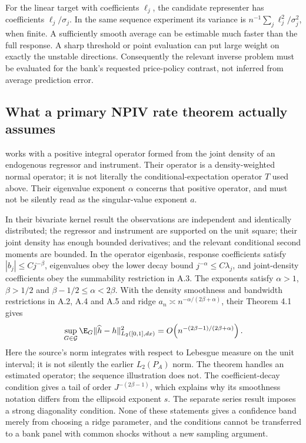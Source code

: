 For the linear target with coefficients $\ell_j$, the candidate
representer has coefficients $\ell_j/\sigma_j$. In the same sequence
experiment its variance is
$n^{-1}\sum_j\ell_j^2/\sigma_j^2$, when finite. A sufficiently
smooth average can be estimable much faster than the full response.
A sharp threshold or point evaluation can put large weight on exactly
the unstable directions. Consequently the relevant inverse problem
must be evaluated for the bank's requested price-policy contrast,
not inferred from average prediction error.

\subsection{What a primary NPIV rate theorem actually assumes}
\citet[Section 2.1]{hall2005} works with a positive integral operator
formed from the joint density of an endogenous regressor and instrument.
Their operator is a density-weighted normal operator; it is not literally
the conditional-expectation operator $T$ used above. Their eigenvalue
exponent $\alpha$ concerns that positive operator, and must not be
silently read as the singular-value exponent $a$.

In their bivariate kernel result the observations are independent and
identically distributed; the regressor and instrument are supported
on the unit square; their joint density has enough bounded derivatives;
and the relevant conditional second moments are bounded. In the
operator eigenbasis, response coefficients satisfy $|b_j|\le Cj^{-\beta}$,
eigenvalues obey the lower decay bound $j^{-\alpha}\le C\lambda_j$,
and joint-density coefficients obey the summability restriction in A.3.
The exponents satisfy $\alpha>1$, $\beta>1/2$ and
$\beta-1/2\le\alpha<2\beta$. With the density smoothness and
bandwidth restrictions in A.2, A.4 and A.5 and ridge
$a_n\asymp n^{-\alpha/(2\beta+\alpha)}$, their Theorem 4.1 gives
\begin{equation}
 \sup_{G\in\mathcal G}\E_G\|\widehat h-h\|_{L_2([0,1],dx)}^2
       =O\!\left(n^{-(2\beta-1)/(2\beta+\alpha)}\right).
 \label{r3:hall-rate}
\end{equation}
Here the source's norm integrates with respect to Lebesgue measure on
the unit interval; it is not silently the earlier $L_2(P_A)$ norm.
The theorem handles an estimated operator; the sequence illustration
does not. The coefficient-decay condition gives a tail of order
$J^{-(2\beta-1)}$, which explains why its smoothness notation differs
from the ellipsoid exponent $s$. The separate series result imposes
a strong diagonality condition. None of these statements gives a
confidence band merely from choosing a ridge parameter, and the
conditions cannot be transferred to a bank panel with common shocks
without a new sampling argument.

